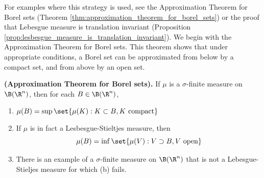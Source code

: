 \documentclass{article} %
\newenvironment{alphabate}
    {\begin{enumerate}[label=\alph*)]}
	{\end{enumerate} }
\begin{document}
For examples where this strategy is used, see the  Approximation Theorem for Borel sets (Theorem \ref{thm:approximation_theorem_for_borel_sets}) or the proof that Lebesgue measure is translation invariant (Proposition \ref{prop:lesbesgue_measure_is_translation_invariant}). We begin with the Approximation Theorem for Borel sets.  This theorem shows that under appropriate conditions, a Borel set can be approximated from below by a compact set, and from above by an open set. 





\begin{theorem}
\textbf{(Approximation Theorem for Borel sets).} If $\mu$ is a $\sigma$-finite measure on $\B(\R^n)$, then for each $B \in \B(\R^n)$,
\begin{alphabate}
\item $\mu(B) = \sup \set{\mu(K) : K \subset B, K \text{ compact}}$
\item If $\mu$ is in fact a Lesbesgue-Stieltjes measure, then
\[ \mu(B) = \inf \set{\mu(V) : V \supset B, V \text{ open}}\]
\item There is an example of a $\sigma$-finite measure on $\B(\R^n)$ that is not a Lebesgue-Stieljes measure for which (b) fails.
\end{alphabate}
\label{thm:approximation_theorem_for_borel_sets}	
\end{theorem}
\end{document}
